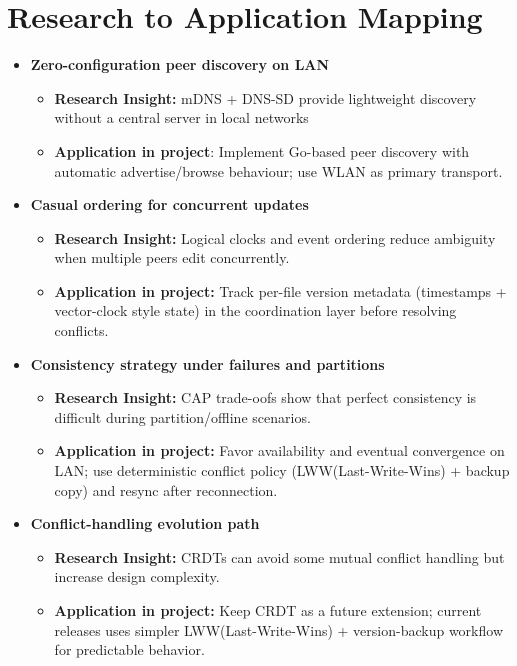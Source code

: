 \documentclass[11pt,oneside]{article}
\begin{document}
\section{Research to Application Mapping}
\begin{itemize}
	\item \textbf{Zero-configuration peer discovery on LAN}
	\begin{itemize}
		\item \textbf{Research Insight: } mDNS + DNS-SD provide lightweight discovery without a central server in local networks
		\item \textbf{Application in project}: Implement Go-based peer discovery with automatic advertise/browse behaviour; use WLAN as primary transport.
	\end{itemize}

	\item \textbf{Casual ordering for concurrent updates}
\begin{itemize}
	\item \textbf{Research Insight:} Logical clocks and event ordering reduce ambiguity when multiple peers edit concurrently.
	\item \textbf{Application in project:} Track per-file version metadata (timestamps + vector-clock style state) in the coordination layer before resolving conflicts.
\end{itemize}

\item \textbf{Consistency strategy under failures and partitions}
\begin{itemize}
	\item \textbf{Research Insight:} CAP trade-oofs show that perfect consistency is difficult during partition/offline scenarios.
	\item \textbf{Application in project:} Favor availability and eventual convergence on LAN; use deterministic conflict policy (LWW(Last-Write-Wins) + backup copy) and resync after reconnection.
\end{itemize}

\item \textbf{Conflict-handling evolution path}
\begin{itemize}
	\item \textbf{Research Insight:} CRDTs can avoid some mutual conflict handling but increase design complexity.
	\item \textbf{Application in project:} Keep CRDT as a future extension; current releases uses simpler LWW(Last-Write-Wins) + version-backup workflow for predictable behavior.
\end{itemize}


\end{itemize}
\end{document}
